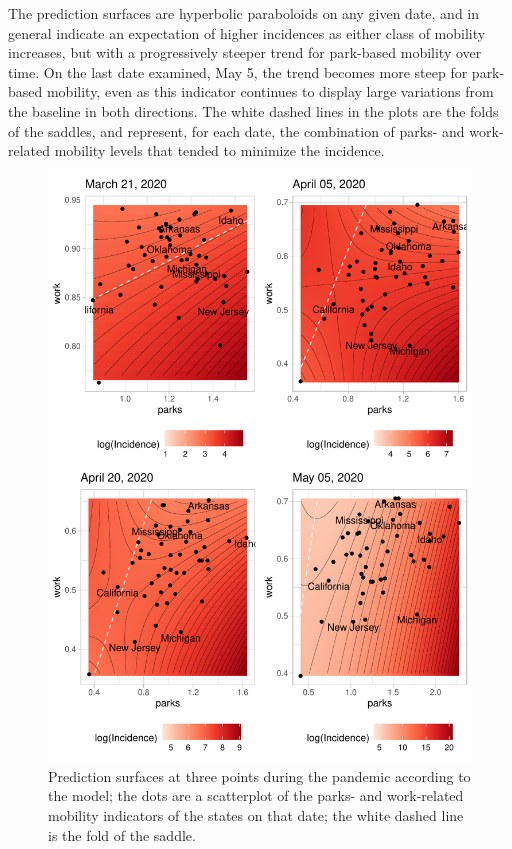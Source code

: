 \documentclass[]{elsarticle} %
\makeatletter
\def\maxwidth{\ifdim\Gin@nat@width>\linewidth\linewidth
\else\Gin@nat@width\fi}
\let\Oldincludegraphics\includegraphics
\renewcommand{\includegraphics}[1]{\Oldincludegraphics[width=\maxwidth]{#1}}
\makeatother
\begin{document}
The prediction surfaces are hyperbolic paraboloids on any given date,
and in general indicate an expectation of higher incidences as either
class of mobility increases, but with a progressively steeper trend for
park-based mobility over time. On the last date examined, May 5, the
trend becomes more steep for park-based mobility, even as this indicator
continues to display large variations from the baseline in both
directions. The white dashed lines in the plots are the folds of the
saddles, and represent, for each date, the combination of parks- and
work-related mobility levels that tended to minimize the incidence.

\begin{figure}
\centering
\includegraphics{Covid-19-Google-CMR-US_files/figure-latex/prediction-plots-1.pdf}
\caption{\label{fig:prediction-plots}Prediction surfaces at three points
during the pandemic according to the model; the dots are a scatterplot
of the parks- and work-related mobility indicators of the states on that
date; the white dashed line is the fold of the saddle.}
\end{figure}
\end{document}
